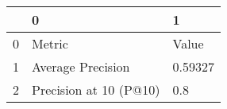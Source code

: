 \begin{tabular}{lll}
\toprule
{} &                       0 &        1 \\
\midrule
0 &                  Metric &    Value \\
1 &       Average Precision &  0.59327 \\
2 &  Precision at 10 (P@10) &      0.8 \\
\bottomrule
\end{tabular}
